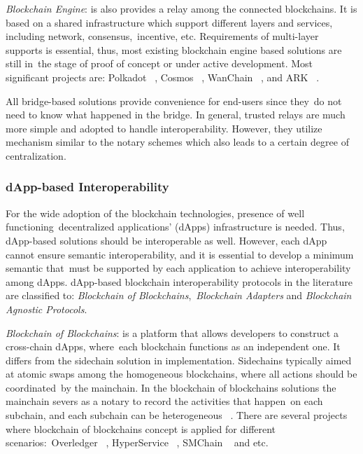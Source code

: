 \emph{Blockchain Engine}: is also provides a relay among the connected blockchains.
It is based on a shared infrastructure which support different layers and services, including network, consensus,\
incentive, etc.
Requirements of multi-layer supports is essential, thus, most existing blockchain engine based solutions are still in\
the stage of proof of concept or under active development.
Most significant projects are: Polkadot ~\cite{cryptoeprint:2020/641}, Cosmos ~\cite{Kwon2019},
WanChain ~\cite{Wanchain}, and ARK ~\cite{ARK}.

All bridge-based solutions provide convenience for end-users since they\
do not need to know what happened in the bridge.
In general, trusted relays are much more simple and adopted to handle interoperability.
However, they utilize mechanism similar to the notary schemes which also leads to a certain degree of centralization.

\subsubsection{dApp-based Interoperability}
For the wide adoption of the blockchain technologies, presence of well functioning\
decentralized applications' (dApps) infrastructure is needed.
Thus, dApp-based solutions should be interoperable as well.
However, each dApp cannot ensure semantic interoperability, and it is essential to develop a minimum semantic that\
must be supported by each application to achieve interoperability among dApps.
dApp-based blockchain interoperability protocols in the literature are classified to: \emph{Blockchain of Blockchains},\
\emph{Blockchain Adapters} and \emph{Blockchain Agnostic Protocols}.

\emph{Blockchain of Blockchains}: is a platform that allows developers to construct a cross-chain dApps, where\
each blockchain functions as an independent one.
It differs from the sidechain solution in implementation.
Sidechains typically aimed at atomic swaps among the homogeneous blockchains, where all actions should be coordinated\
by the mainchain.
In the blockchain of blockchains solutions the mainchain severs as a notary to record the activities that happen\
on each subchain, and each subchain can be heterogeneous ~\cite{cryptoeprint:2021/537}.
There are several projects where blockchain of blockchains concept is applied for different scenarios:\
Overledger ~\cite{Verdian2018}, HyperService ~\cite{Liu2019}, SMChain ~\cite{cryptoeprint:2019/1401} and etc.



